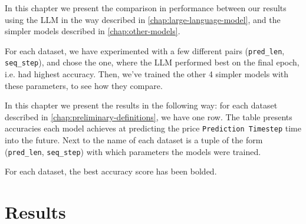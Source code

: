 In this chapter we present the comparison in performance between our results using the LLM in the way described in \autoref{chap:large-language-model}, and the simpler models described in \autoref{chap:other-models}.

For each dataset, we have experimented with a few different pairs (\verb|pred_len|, \verb|seq_step|), and chose the one, where the LLM performed best on the final epoch, i.e. had highest accuracy. Then, we've trained the other 4 simpler models with these parameters, to see how they compare.

In this chapter we present the results in the following way: for each dataset described in \autoref{chap:preliminary-definitions}, we have one row. The table presents accuracies each model achieves at predicting the price \verb|Prediction Timestep| time into the future. Next to the name of each dataset is a tuple of the form (\verb|pred_len|, \verb|seq_step|) with which parameters the models were trained.

For each dataset, the best accuracy score has been bolded.

\section{Results}


